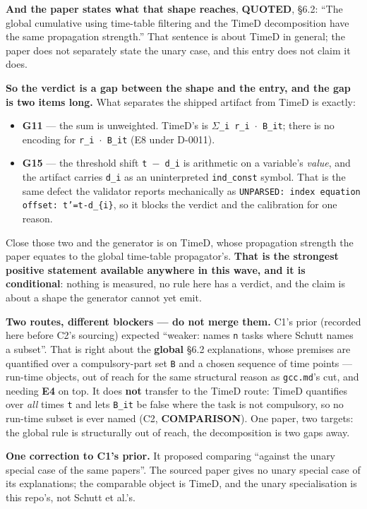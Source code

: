 \documentclass[10pt,a4paper]{article}
\newcommand{\provtag}[2]{{\small\sffamily\bfseries\textcolor{#1}{#2}}}
\newenvironment{calblock}{%
  \par\smallskip
  \def\FrameCommand{\textcolor{calbar}{\vrule width 1pt}\hspace{9pt}}%
  \MakeFramed{\advance\hsize-\width\FrameRestore}}%
  {\endMakeFramed\par\smallskip}
\begin{document}
\begin{calblock}
\textbf{And the paper states what that shape reaches}, \provtag{tagquoted}{QUOTED}, \S{}6.2: ``The global cumulative using time-table filtering and the TimeD decomposition have the same propagation strength.'' That sentence is about TimeD in general; the paper does not separately state the unary case, and this entry does not claim it does.

\textbf{So the verdict is a gap between the shape and the entry, and the gap is two items long.} What separates the shipped artifact from TimeD is exactly:

\begin{itemize}\setlength{\itemsep}{0pt}
\item \textbf{G11} --- the sum is unweighted. TimeD's is \texttt{$\Sigma$\_i r\_i $\cdot$ B\_it}; there is no encoding for \texttt{r\_i $\cdot$ B\_it} (E8 under D-0011).
\item \textbf{G15} --- the threshold shift \texttt{t $-$ d\_i} is arithmetic on a variable's \emph{value}, and the artifact carries \texttt{d\_i} as an uninterpreted \texttt{ind\_const} symbol. That is the same defect the validator reports mechanically as \texttt{UNPARSED: index equation offset: t'=t-\allowbreak{}d\_\allowbreak{}\{i\}}, so it blocks the verdict and the calibration for one reason.
\end{itemize}
Close those two and the generator is on TimeD, whose propagation strength the paper equates to the global time-table propagator's. \textbf{That is the strongest positive statement available anywhere in this wave, and it is conditional}: nothing is measured, no rule here has a verdict, and the claim is about a shape the generator cannot yet emit.

\textbf{Two routes, different blockers --- do not merge them.} C1's prior (recorded here before C2's sourcing) expected ``weaker: names \texttt{n} tasks where Schutt names a subset''. That is right about the \textbf{global} \S{}6.2 explanations, whose premises are quantified over a compulsory-part set \texttt{B} and a chosen sequence of time points --- run-time objects, out of reach for the same structural reason as \texttt{gcc.md}'s cut, and needing \textbf{E4} on top. It does \textbf{not} transfer to the TimeD route: TimeD quantifies over \emph{all} times \texttt{t} and lets \texttt{B\_it} be false where the task is not compulsory, so no run-time subset is ever named (C2, \provtag{tagcomparison}{COMPARISON}). One paper, two targets: the global rule is structurally out of reach, the decomposition is two gaps away.

\textbf{One correction to C1's prior.} It proposed comparing ``against the unary special case of the same papers''. The sourced paper gives no unary special case of its explanations; the comparable object is TimeD, and the unary specialisation is this repo's, not Schutt et al.'s.

\end{calblock}
\end{document}
